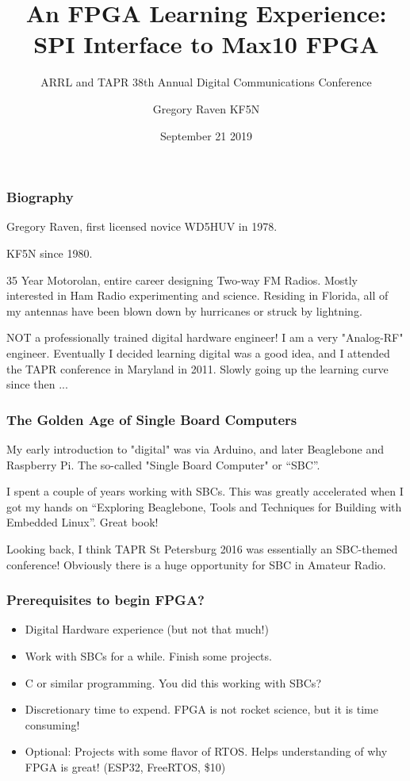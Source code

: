\documentclass{beamer}
\title{An FPGA Learning Experience: SPI Interface to Max10 FPGA}
\subtitle{ARRL and TAPR 38th Annual Digital Communications Conference}
\author{Gregory Raven KF5N}
\date{September 21 2019}
\begin{document}
	
	\frame{\titlepage}
	
	\begin{frame}
	\frametitle{Biography}
	Gregory Raven, first licensed novice WD5HUV in 1978.
	
	KF5N since 1980.
	
	35 Year Motorolan, entire career designing Two-way FM Radios.
	Mostly interested in Ham Radio experimenting and science.
	Residing in Florida, all of my antennas have been blown down by hurricanes or struck by lightning.
	
	NOT a professionally trained digital hardware engineer!  I am a very "Analog-RF" engineer.
	Eventually I decided learning digital was a good idea, and I attended the TAPR conference in Maryland in 2011.  Slowly going up the learning curve since then ...
\end{frame}

	\begin{frame}
	\frametitle{The Golden Age of Single Board Computers}
	
	My early introduction to "digital" was via Arduino, and later Beaglebone and Raspberry Pi.
	The so-called "Single Board Computer" or ``SBC''.
	
	I spent a couple of years working with SBCs.  This was greatly accelerated when I got my hands on ``Exploring Beaglebone, Tools and Techniques for Building with Embedded Linux''.  Great book!
	
	Looking back, I think TAPR St Petersburg 2016 was essentially an SBC-themed conference!
	Obviously there is a huge opportunity for SBC in Amateur Radio.
	
\end{frame}

\begin{frame}
\frametitle{Prerequisites to begin FPGA?}


\begin{itemize}
	\item Digital Hardware experience (but not that much!)
\item Work with SBCs for a while.  Finish some projects.
\item C or similar programming.  You did this working with SBCs?
\item Discretionary time to expend.  FPGA is not rocket science, but it is time consuming!
\item Optional:  Projects with some flavor of RTOS.  Helps understanding of why FPGA is great! (ESP32, FreeRTOS, \$10)
\end{itemize}


\end{frame}
\end{document}
